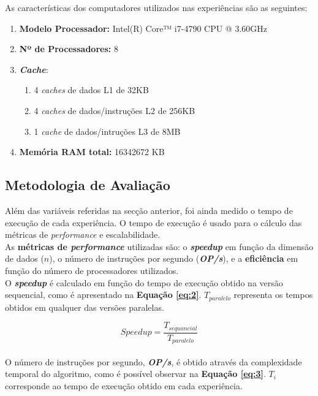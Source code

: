 \documentclass[a4paper]{article}
\begin{document}
As características dos computadores utilizados nas experiências são as seguintes:
\begin{enumerate}
\item \textbf{Modelo Processador:} Intel(R) Core™ i7-4790 CPU @ 3.60GHz
\item \textbf{Nº de Processadores:} 8
\item \textbf{\textit{Cache}}:
\begin{enumerate}
\item 4 \textit{caches} de dados L1 de 32KB
\item 4 \textit{caches} de dados/instruções L2 de 256KB
\item 1 \textit{cache} de dados/intruções L3 de 8MB
\end{enumerate}
\item \textbf{Memória RAM total:} 16342672 KB
\end{enumerate}  


\subsection{Metodologia de Avaliação}

Além das variáveis referidas na secção anterior, foi ainda medido o tempo de execução de cada experiência. O tempo de execução é usado para o cálculo das métricas de \textit{performance} e escalabilidade.\\

As \textbf{métricas de \textit{performance}} utilizadas são: o \textbf{\textit{speedup}} em função da dimensão de dados ($n$), o número de instruções por segundo (\textbf{\textit{OP/s}}), e a \textbf{eficiência} em função do número de processadores utilizados.\\

O \textbf{\textit{speedup}} é calculado em função do tempo de execução obtido na versão sequencial, como é apresentado na \textbf{Equação \ref{eq:2}}. $T_{paralelo}$ representa os tempos obtidos em qualquer das versões paralelas.

\begin{equation}
\label{eq:2}
    Speedup = \frac{T_{sequancial}}{T_{paralelo}}
\end{equation}
\\

O número de instruções por segundo, \textbf{\textit{OP/s}}, é obtido através da complexidade temporal do algoritmo, como é possível observar na \textbf{Equação \ref{eq:3}}. $T_i$ corresponde ao tempo de execução obtido em cada experiência.
\end{document}
